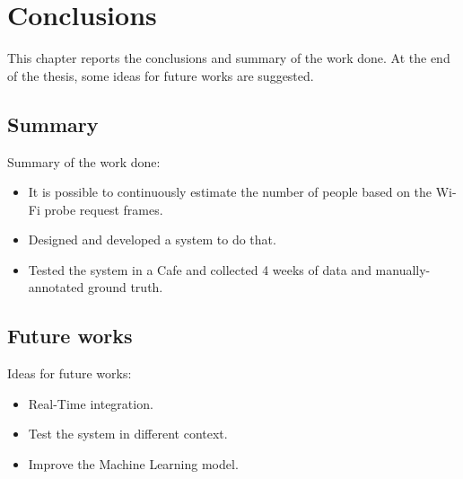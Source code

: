 \chapter{Conclusions}
\label{cha:conclusions}
\vspace{0.4 cm} 

This chapter reports the conclusions and summary of the work done. At the end of the thesis, some ideas for future works are suggested.


\section{Summary}
\label{sec:future}
\vspace{0.2 cm} 

Summary of the work done:
\begin{itemize}
  \item It is possible to continuously estimate the number of people based on the Wi-Fi probe request frames.
  \item Designed and developed a system to do that.
  \item Tested the system in a Cafe and collected 4 weeks of data and manually-annotated ground truth.
\end{itemize}


\section{Future works}
\label{sec:future}
\vspace{0.2 cm} 

Ideas for future works:
\begin{itemize}
  \item Real-Time integration.
  \item Test the system in different context.
  \item Improve the Machine Learning model.
\end{itemize}
